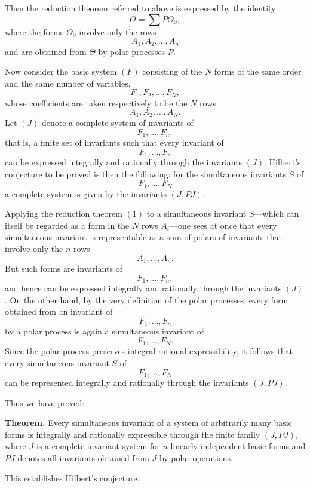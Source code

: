 \documentclass[11pt]{article}
\begin{document}
Then the reduction theorem referred to above is expressed by the identity
\[
\Theta = \sum P\Theta_0,
\tag{1}
\]
where the forms \(\Theta_0\) involve only the rows
\[
A_1,A_2,\dots,A_n
\]
and are obtained from \(\Theta\) by polar processes \(P\).

Now consider the basic system \((F)\) consisting of the \(N\) forms of the same order and the same number of variables,
\[
F_1,F_2,\dots,F_N,
\]
whose coefficients are taken respectively to be the \(N\) rows
\[
A_1,A_2,\dots,A_N.
\]
Let \((J)\) denote a complete system of invariants of
\[
F_1,\dots,F_n,
\]
that is, a finite set of invariants such that every invariant of
\[
F_1,\dots,F_n
\]
can be expressed integrally and rationally through the invariants \((J)\). Hilbert's conjecture to be proved is then the following: for the simultaneous invariants \(S\) of
\[
F_1,\dots,F_N
\]
a complete system is given by the invariants \((J,PJ)\).

Applying the reduction theorem \((1)\) to a simultaneous invariant \(S\)---which can itself be regarded as a form in the \(N\) rows \(A_i\)---one sees at once that every simultaneous invariant is representable as a sum of polars of invariants that involve only the \(n\) rows
\[
A_1,\dots,A_n.
\]
But such forms are invariants of
\[
F_1,\dots,F_n,
\]
and hence can be expressed integrally and rationally through the invariants \((J)\). On the other hand, by the very definition of the polar processes, every form obtained from an invariant of
\[
F_1,\dots,F_n
\]
by a polar process is again a simultaneous invariant of
\[
F_1,\dots,F_N.
\]
Since the polar process preserves integral rational expressibility, it follows that every simultaneous invariant \(S\) of
\[
F_1,\dots,F_N
\]
can be represented integrally and rationally through the invariants \((J,PJ)\).

Thus we have proved:

\medskip
\noindent\textbf{Theorem.}
Every simultaneous invariant of a system of arbitrarily many basic forms is integrally and rationally expressible through the finite family \((J,PJ)\), where \(J\) is a complete invariant system for \(n\) linearly independent basic forms and \(PJ\) denotes all invariants obtained from \(J\) by polar operations.

\medskip
This establishes Hilbert's conjecture.

\bigskip
\end{document}
